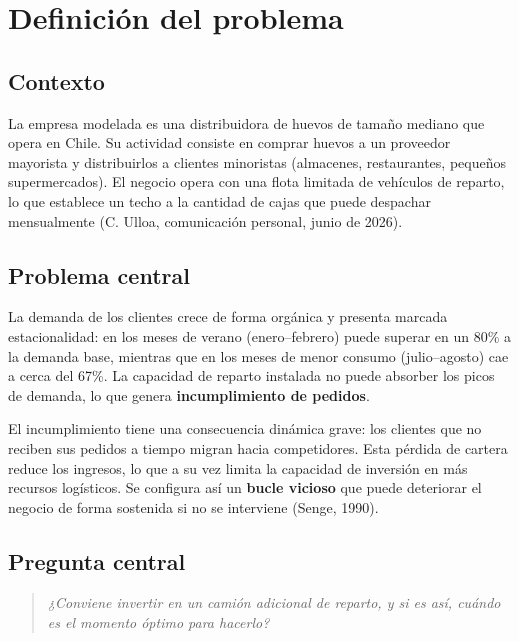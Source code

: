 \documentclass[10pt,a4paper]{article}
\begin{document}
\newpage

\section{Definición del problema}

\subsection{Contexto}

La empresa modelada es una distribuidora de huevos de tamaño mediano que opera en Chile. Su actividad consiste en comprar huevos a un proveedor mayorista y distribuirlos a clientes minoristas (almacenes, restaurantes, pequeños supermercados). El negocio opera con una flota limitada de vehículos de reparto, lo que establece un techo a la cantidad de cajas que puede despachar mensualmente (C. Ulloa, comunicación personal, junio de 2026).

\subsection{Problema central}

La demanda de los clientes crece de forma orgánica y presenta marcada estacionalidad: en los meses de verano (enero–febrero) puede superar en un 80\% a la demanda base, mientras que en los meses de menor consumo (julio–agosto) cae a cerca del 67\%. La capacidad de reparto instalada no puede absorber los picos de demanda, lo que genera \textbf{incumplimiento de pedidos}.

El incumplimiento tiene una consecuencia dinámica grave: los clientes que no reciben sus pedidos a tiempo migran hacia competidores. Esta pérdida de cartera reduce los ingresos, lo que a su vez limita la capacidad de inversión en más recursos logísticos. Se configura así un \textbf{bucle vicioso} que puede deteriorar el negocio de forma sostenida si no se interviene (Senge, 1990).

\subsection{Pregunta central}

\begin{quote}
\textit{¿Conviene invertir en un camión adicional de reparto, y si es así, cuándo es el momento óptimo para hacerlo?}
\end{quote}
\end{document}
